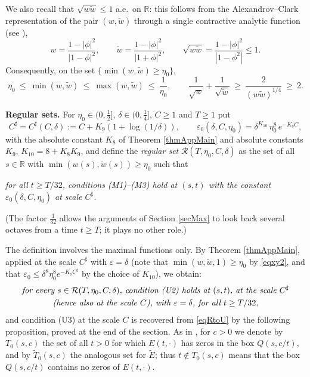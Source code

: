 \documentclass[11pt,twoside,reqno]{amsart}
\def\ti{\tilde}
\def\R{{\mathbb R}}
\def\RR{{\mathcal{R}}}
\def\e{\varepsilon}
\def\d{\delta}
\theoremstyle{plain}
\numberwithin{equation}{section}
\begin{document}
We also recall that $\sqrt{w\ti w}\leq1$ a.e.\ on $\R$: this follows from the Alexandrov--Clark representation of the pair $(w,\ti w)$ through a single contractive analytic function (see \cite{MIF1}),
$$w=\frac{1-|\phi|^2}{|1-\phi|^2},\qquad \ti w=\frac{1-|\phi|^2}{|1+\phi|^2},\qquad
\sqrt{w\ti w}=\frac{1-|\phi|^2}{|1-\phi^2|}\leq1 .$$
Consequently, on the set $\{\min(w,\ti w)\geq\eta_0\}$,
\begin{equation}
\eta_0\ \leq\ \min(w,\ti w)\ \leq\ \max(w,\ti w)\ \leq\ \frac1{\eta_0},
\qquad
\frac 1{\sqrt{w}}+\frac 1{\sqrt{\ti w}}\ \geq\ \frac 2{(w\ti w)^{1/4}}\ \geq\ 2 .
\label{eqxy2}
\end{equation}

{\bf Regular sets.} For $\eta_0\in(0,\tfrac12]$, $\d\in(0,\tfrac14]$, $C\geq1$ and $T\geq1$ put
\begin{equation}
C^\sharp=C^\sharp(C,\d):=C+K_9\left(1+\log(1/\d)\right),
\qquad
\e_0(\d,C,\eta_0)=\d^{K_{10}}\,\eta_0^{8}\,e^{-K_8C},
\label{eqEpsZero}
\end{equation}
with the absolute constant $K_8$ of Theorem \ref{thmAppMain} and absolute constants $K_9$, $K_{10}=8+K_8K_9$, and define the {\it regular set} $\RR(T,\eta_0,C,\d)$ as the set of all $s\in\R$ with $\min\left(w(s),\ti w(s)\right)\geq\eta_0$ such that

{\it for all $t\geq T/32$, conditions (M1)--(M3) hold at $(s,t)$ with the constant $\e_0(\d,C,\eta_0)$ at scale $C^\sharp$.}

(The factor $\tfrac1{32}$ allows the arguments of Section \ref{secMax} to look back several octaves from a time $t\geq T$; it plays no other role.)

The definition involves the maximal functions only. By Theorem \ref{thmAppMain}, applied at the scale $C^\sharp$ with $\e=\d$ (note that $\min(w,\ti w,1)\geq\eta_0$ by \eqref{eqxy2}, and that $\e_0\leq\d^8\eta_0^8e^{-K_8C^\sharp}$ by the choice of $K_{10}$), we obtain:
\begin{equation}
\begin{gathered}
\text{\it for every }s\in\RR(T,\eta_0,C,\d)\text{\it , condition (U2) holds at $(s,t)$, at the scale $C^\sharp$}\\
\text{\it (hence also at the scale $C$), with $\e=\d$, for all }t\geq T/32 ,
\end{gathered}
\label{eqRtoU}
\end{equation}
and condition (U3) at the scale $C$ is recovered from \eqref{eqRtoU} by the following proposition, proved at the end of the section. As in \cite{Scatter}, for $c>0$ we denote by $T_0(s,c)$ the set of all $t>0$ for which $E(t,\cdot)$ has zeros in the box $Q(s,c/t)$, and by $\ti T_0(s,c)$ the analogous set for $\ti E$; thus $t\notin T_0(s,c)$ means that the box $Q(s,c/t)$ contains no zeros of $E(t,\cdot)$.
\end{document}
